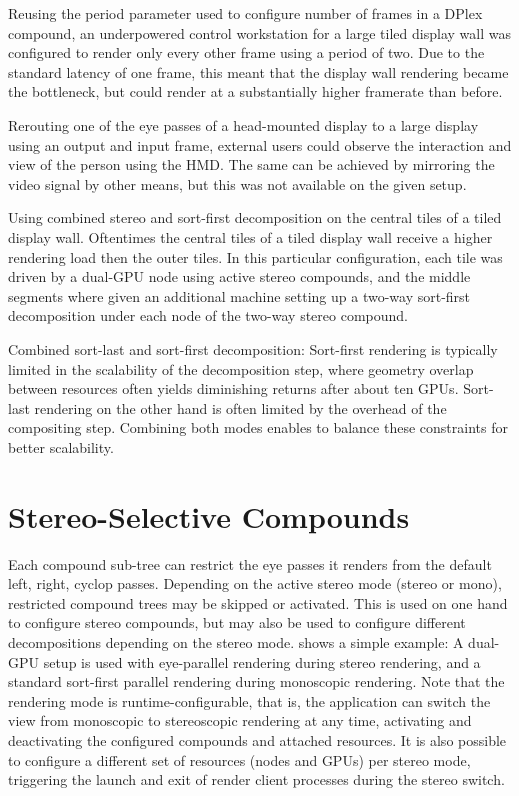 \begin{compactitem}

\item Reusing the \textsf{period} parameter used to configure number of frames
in a DPlex compound, an underpowered control workstation for a large tiled
display wall was configured to render only every other frame using a period of
two. Due to the standard latency of one frame, this meant that the display wall
rendering became the bottleneck, but could render at a substantially higher
framerate than before.

\item Rerouting one of the eye passes of a head-mounted display to a large
display using an output and input frame, external users could observe the
interaction and view of the person using the HMD. The same can be achieved by
mirroring the video signal by other means, but this was not available on the
given setup.

\item Using combined stereo and sort-first decomposition on the central tiles of
a tiled display wall. Oftentimes the central tiles of a tiled display wall
receive a higher rendering load then the outer tiles. In this particular
configuration, each tile was driven by a dual-GPU node using active stereo
compounds, and the middle segments where given an additional machine setting up
a two-way sort-first decomposition under each node of the two-way stereo
compound.

\item Combined sort-last and sort-first decomposition: Sort-first rendering is
typically limited in the scalability of the decomposition step, where geometry
overlap between resources often yields diminishing returns after about ten
GPUs. Sort-last rendering on the other hand is often limited by the overhead of
the compositing step. Combining both modes enables to balance these constraints
for better scalability.

\end{compactitem}

\section{Stereo-Selective Compounds}

Each compound sub-tree can restrict the eye passes it renders from the default
left, right, cyclop passes. Depending on the active stereo mode (stereo or
mono), restricted compound trees may be skipped or activated. This is used on
one hand to configure stereo compounds, but may also be used to configure
different decompositions depending on the stereo mode.  shows
a simple example: A dual-GPU setup is used with eye-parallel rendering during
stereo rendering, and a standard sort-first parallel rendering during monoscopic
rendering. Note that the rendering mode is runtime-configurable, that is, the
application can switch the view from monoscopic to stereoscopic rendering at any
time, activating and deactivating the configured compounds and attached
resources. It is also possible to configure a different set of resources (nodes
and GPUs) per stereo mode, triggering the launch and exit of render client
processes during the stereo switch.

